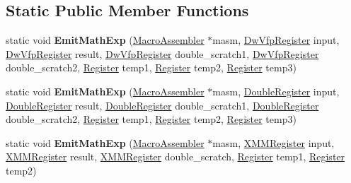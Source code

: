 \subsection*{Static Public Member Functions}
\begin{DoxyCompactItemize}
\item 
static void {\bfseries Emit\+Math\+Exp} (\hyperlink{classv8_1_1internal_1_1_macro_assembler}{Macro\+Assembler} $\ast$masm, \hyperlink{structv8_1_1internal_1_1_double_register}{Dw\+Vfp\+Register} input, \hyperlink{structv8_1_1internal_1_1_double_register}{Dw\+Vfp\+Register} result, \hyperlink{structv8_1_1internal_1_1_double_register}{Dw\+Vfp\+Register} double\+\_\+scratch1, \hyperlink{structv8_1_1internal_1_1_double_register}{Dw\+Vfp\+Register} double\+\_\+scratch2, \hyperlink{structv8_1_1internal_1_1_register}{Register} temp1, \hyperlink{structv8_1_1internal_1_1_register}{Register} temp2, \hyperlink{structv8_1_1internal_1_1_register}{Register} temp3)\hypertarget{classv8_1_1internal_1_1_math_exp_generator_a3fc2f5f0fe7a623743dea32ff58f2ff3}{}\label{classv8_1_1internal_1_1_math_exp_generator_a3fc2f5f0fe7a623743dea32ff58f2ff3}

\item 
static void {\bfseries Emit\+Math\+Exp} (\hyperlink{classv8_1_1internal_1_1_macro_assembler}{Macro\+Assembler} $\ast$masm, \hyperlink{structv8_1_1internal_1_1_double_register}{Double\+Register} input, \hyperlink{structv8_1_1internal_1_1_double_register}{Double\+Register} result, \hyperlink{structv8_1_1internal_1_1_double_register}{Double\+Register} double\+\_\+scratch1, \hyperlink{structv8_1_1internal_1_1_double_register}{Double\+Register} double\+\_\+scratch2, \hyperlink{structv8_1_1internal_1_1_register}{Register} temp1, \hyperlink{structv8_1_1internal_1_1_register}{Register} temp2, \hyperlink{structv8_1_1internal_1_1_register}{Register} temp3)\hypertarget{classv8_1_1internal_1_1_math_exp_generator_a5d8428748e1b4e312dadcde9a6871e3f}{}\label{classv8_1_1internal_1_1_math_exp_generator_a5d8428748e1b4e312dadcde9a6871e3f}

\item 
static void {\bfseries Emit\+Math\+Exp} (\hyperlink{classv8_1_1internal_1_1_macro_assembler}{Macro\+Assembler} $\ast$masm, \hyperlink{structv8_1_1internal_1_1_double_register}{X\+M\+M\+Register} input, \hyperlink{structv8_1_1internal_1_1_double_register}{X\+M\+M\+Register} result, \hyperlink{structv8_1_1internal_1_1_double_register}{X\+M\+M\+Register} double\+\_\+scratch, \hyperlink{structv8_1_1internal_1_1_register}{Register} temp1, \hyperlink{structv8_1_1internal_1_1_register}{Register} temp2)\hypertarget{classv8_1_1internal_1_1_math_exp_generator_abdf44f1fc20208dbf60a845dd843f456}{}\label{classv8_1_1internal_1_1_math_exp_generator_abdf44f1fc20208dbf60a845dd843f456}


\end{DoxyCompactItemize}
